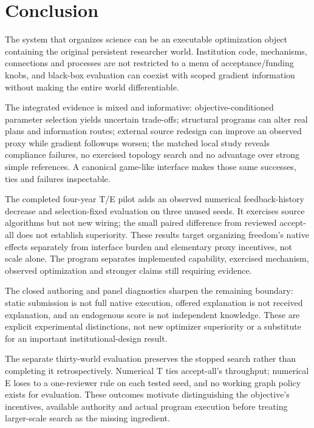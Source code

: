 \clearpage
\section{Conclusion}
The system that organizes science can be an executable optimization object
containing the original persistent researcher world. Institution code,
mechanisms, connections and processes are not restricted to a menu of
acceptance/funding knobs, and black-box evaluation can coexist with scoped
gradient information without making the entire world differentiable.

The integrated evidence is mixed and informative: objective-conditioned
parameter selection yields uncertain trade-offs; structural programs can alter
real plans and information routes; external source redesign can improve an
observed proxy while gradient followups worsen; the matched local study
reveals compliance failures, no exercised topology search and no advantage
over strong simple references. A canonical game-like interface makes those
same successes, ties and failures inspectable.

The completed four-year T/E pilot adds an observed numerical feedback-history
decrease and selection-fixed evaluation on three unused seeds. It exercises
source algorithms but not new wiring; the small paired difference from reviewed
accept-all does not establish superiority. These results target organizing
freedom's native effects separately from interface burden and elementary proxy
incentives, not scale alone. The program separates implemented capability,
exercised mechanism, observed optimization and stronger claims still requiring
evidence.

The closed authoring and panel diagnostics sharpen the remaining boundary:
static submission is not full native execution, offered explanation is not
received explanation, and an endogenous score is not independent knowledge.
These are explicit experimental distinctions, not new optimizer superiority
or a substitute for an important institutional-design result.

The separate thirty-world evaluation preserves the stopped search rather than
completing it retrospectively. Numerical T ties accept-all's throughput;
numerical E loses to a one-reviewer rule on each tested seed, and no working
graph policy exists for evaluation. These outcomes motivate distinguishing
the objective's incentives, available authority and actual program execution
before treating larger-scale search as the missing ingredient.

